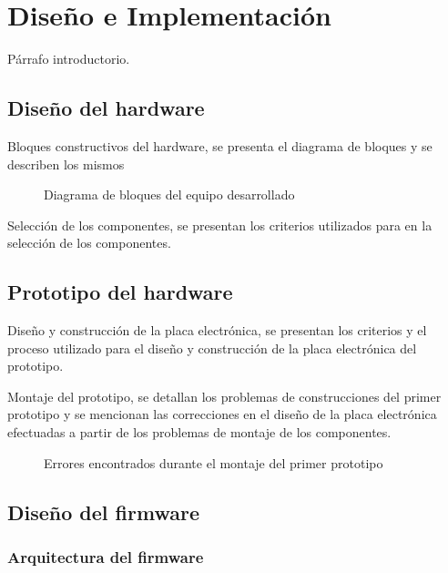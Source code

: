 \chapter{Diseño e Implementación} %
\label{Chapter3} 

Párrafo introductorio.

\section{Diseño del hardware}
\label{sec:hardware}

Bloques constructivos del hardware, se presenta el diagrama de bloques y se describen los mismos

\begin{figure}[ht]
	\centering
	\caption{Diagrama de bloques del equipo desarrollado}
	\label{fig:DiagramaBloques}
\end{figure}

Selección de los componentes, se presentan los criterios utilizados para en la selección de los componentes.

\section{Prototipo del hardware}
\label{sec:prototipo}

Diseño y construcción de la placa electrónica, se presentan los criterios y el proceso utilizado para el diseño y construcción de la placa electrónica del prototipo.

Montaje del prototipo, se detallan los problemas de construcciones del primer prototipo y se mencionan las correcciones en el diseño de la placa electrónica efectuadas a partir de los problemas de montaje de los componentes.

\begin{figure}[ht]
	\centering
	\caption{Errores encontrados durante el montaje del primer prototipo}
	\label{fig:ErroresMontaje}
\end{figure}

\section{Diseño del firmware}
\label{sec:firmware}

\subsection{Arquitectura del firmware}

